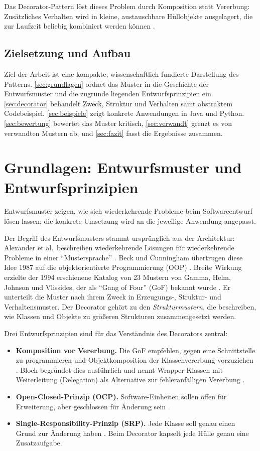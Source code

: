 \documentclass[a4paper,11pt,toc=listof,toc=bibliography]{scrartcl}
\begin{document}
Das Decorator-Pattern löst dieses Problem durch Komposition statt Vererbung: Zusätzliches Verhalten wird in kleine, austauschbare Hüllobjekte ausgelagert, die zur Laufzeit beliebig kombiniert werden können \cite[S.~175--184]{GHJV94}.

\subsection{Zielsetzung und Aufbau}
Ziel der Arbeit ist eine kompakte, wissenschaftlich fundierte Darstellung des Patterns. \autoref{sec:grundlagen} ordnet das Muster in die Geschichte der Entwurfsmuster und die zugrunde liegenden Entwurfsprinzipien ein. \autoref{sec:decorator} behandelt Zweck, Struktur und Verhalten samt abstraktem Codebeispiel. \autoref{sec:beispiele} zeigt konkrete Anwendungen in Java und Python. \autoref{sec:bewertung} bewertet das Muster kritisch, \autoref{sec:verwandt} grenzt es von verwandten Mustern ab, und \autoref{sec:fazit} fasst die Ergebnisse zusammen.

\section{Grundlagen: Entwurfsmuster und Entwurfsprinzipien}
\label{sec:grundlagen}

Entwurfsmuster zeigen, wie sich wiederkehrende Probleme beim Softwareentwurf lösen lassen; die konkrete Umsetzung wird an die jeweilige Anwendung angepasst.

Der Begriff des Entwurfsmusters stammt ursprünglich aus der Architektur: Alexander et al.\ beschreiben wiederkehrende Lösungen für wiederkehrende Probleme in einer \enquote{Mustersprache} \cite{AIS77}. Beck und Cunningham übertrugen diese Idee 1987 auf die objektorientierte Programmierung (\acs{OOP}) \cite{BC87}. Breite Wirkung erzielte der 1994 erschienene Katalog von 23 Mustern von Gamma, Helm, Johnson und Vlissides, der als \enquote{Gang of Four} (\acs{GoF}) bekannt wurde \cite{GHJV94}. Er unterteilt die Muster nach ihrem Zweck in Erzeugungs-, Struktur- und Verhaltensmuster. Der Decorator gehört zu den \emph{Strukturmustern}, die beschreiben, wie Klassen und Objekte zu größeren Strukturen zusammengesetzt werden.

Drei Entwurfsprinzipien sind für das Verständnis des Decorators zentral:
\begin{itemize}
  \item \textbf{Komposition vor Vererbung.} Die \acs{GoF} empfehlen, gegen eine Schnittstelle zu programmieren und Objektkomposition der Klassenvererbung vorzuziehen \cite{GHJV94}. Bloch begründet dies ausführlich und nennt Wrapper-Klassen mit Weiterleitung (Delegation) als Alternative zur fehleranfälligen Vererbung \cite{Blo18}.
  \item \textbf{Open-Closed-Prinzip (\acs{OCP}).} Software-Einheiten sollen offen für Erweiterung, aber geschlossen für Änderung sein \cite{Mey88,Mar03}.
  \item \textbf{Single-Responsibility-Prinzip (\acs{SRP}).} Jede Klasse soll genau einen Grund zur Änderung haben \cite{Mar03}. Beim Decorator kapselt jede Hülle genau eine Zusatzaufgabe.
\end{itemize}
\end{document}
